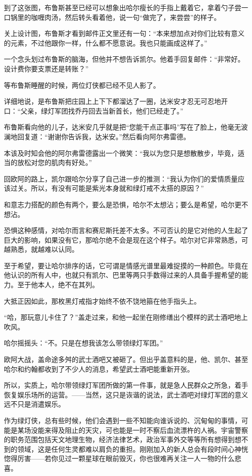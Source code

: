 \documentclass[../main]{subfiles}
\begin{document}
到了这张图，布鲁斯甚至已经可以想象出哈尔瘦长的手指上戴着它，拿着勺子尝一口锅里的咖喱肉汤，然后转头看着他，说一句“做完了，来尝尝”的样子。

关上设计图，布鲁斯才看到邮件正文里还有一句：“本来想加点对你们比较有意义的元素，不过他跟你一样，什么都不愿意说。我也只能画成这样了。”

一个念头划过布鲁斯的脑海，但他并不想告诉凯尔。他着手回复邮件：“非常好。设计费你要支票还是转账？”

等布鲁斯睡醒的时候，两位灯侠都已经不见人影了。

详细地说，是布鲁斯把庄园上上下下都溜达了一圈，达米安才忍无可忍地开口：“父亲，绿灯军团找乔丹回去当新首长，他们已经走了。”

布鲁斯看向他的儿子，达米安几乎就是把“您能干点正事吗”写在了脸上，他毫无波澜地回复道：“谢谢你告诉我，达米安。”然后看向阿尔弗雷德。

本该及时知会他的阿尔弗雷德露出一个微笑：“我以为您只是想散散步，毕竟，适当的放松对您的肌肉有好处。”

回欧阿的路上，凯尔跟哈尔分享了自己进一步的推测：“我认为你们的爱情质量应该过关。所以，有没有可能是紫光本身就和绿灯戒不太搭的原因？”

和意志力搭配的颜色有两个，要么是恐惧，哈尔不太想沾；要么是希望，哈尔更不想沾。

恐惧这种感情，对哈尔而言和赛尼斯托差不太多。不可否认的是它对他的人生起了巨大的影响，如果没有它，那哈尔绝不会是现在这个样子。哈尔对它非常熟悉，可越熟悉，就越难以认同。

至于希望，要让哈尔排序的话，它可谓是情感光谱里最难捉摸的一种颜色。毕竟在他认识的所有人中，也就只有凯尔、巴里等两只手数得过来的人具备手握希望的能力。至于他本人，绝不在其列。

大抵正因如此，那枚黑灯戒指才始终不依不饶地箍在他手指头上。

“哈，那玩意儿卡住了？”盖走过来，和他一起坐在刚修缮出个模样的武士酒吧地上吹风。

哈尔摇摇头：“不。只是在想我该怎么带领绿灯军团。”

欧阿大战，盖命途多舛的武士酒吧又被砸了。但出乎盖意料的是，他、凯尔、甚至哈尔和约翰都收到了不少人的消息，希望武士酒吧能重新开张。

所以，实质上，哈尔带领绿灯军团所做的第一件事，就是急人民群众之所急，着手恢复娱乐场所的运营。——当然，这只是诙谐的说法，武士酒吧对绿灯军团的意义远不只是消遣娱乐。

作为绿灯侠，总有些时候，他们会遇到一些不知能向谁诉说的、沉甸甸的事情，可能是某场没能来得及阻止的天灾，可也能是一时不察后血流漂杵的人祸。宇宙警察的职务范围包括天文地理生物，经济法律艺术，政治军事外交等等所有想得到想不到的领域，这是任何生灵都难以肩负的重担。刚刚加入的新人总会有段时间心神恍惚得厉害——若你见过一颗星球在眼前毁灭，你也很难再关注一人一物的什么悲喜。
\end{document}
